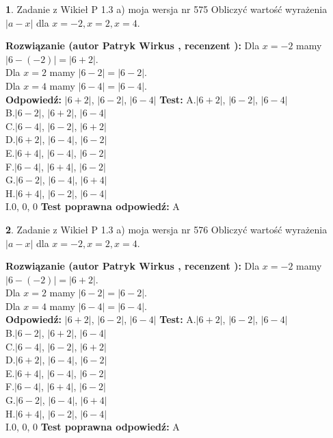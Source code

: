 \documentclass[12pt, a4paper]{article}
\theoremstyle{definition} %
\newtheorem{zad}{}
\newcommand{\zadStart}[1]{\begin{zad}#1\newline}
\newcommand{\zadStop}{\end{zad}}
\newcommand{\rozwStart}[2]{\noindent \textbf{Rozwiązanie (autor #1 , recenzent #2): }\newline}
\newcommand{\rozwStop}{\newline}
\newcommand{\odpStart}{\noindent \textbf{Odpowiedź:}\newline}
\newcommand{\odpStop}{\newline}
\newcommand{\testStart}{\noindent \textbf{Test:}\newline}
\newcommand{\testStop}{\newline}
\newcommand{\kluczStart}{\noindent \textbf{Test poprawna odpowiedź:}\newline}
\newcommand{\kluczStop}{\newline}
\begin{document}
\zadStart{Zadanie z Wikieł P 1.3 a) moja wersja nr 575}
Obliczyć wartość wyrażenia $|a - x|$ dla $x=-2,x=2,x=4$.
\zadStop
\rozwStart{Patryk Wirkus}{}
Dla $x = -2$ mamy $|6 - (-2)| = |6 + 2|$.\\
Dla $x = 2$ mamy $|6 - 2| = |6 - 2|$.\\
Dla $x = 4$ mamy $|6 - 4| = |6 - 4|$.\\
\rozwStop
\odpStart
$|6 + 2|$, $|6 - 2|$, $|6 - 4|$
\odpStop
\testStart
A.$|6 + 2|$, $|6 - 2|$, $|6 - 4|$\\
B.$|6 - 2|$, $|6 + 2|$, $|6 - 4|$\\
C.$|6 - 4|$, $|6 - 2|$, $|6 + 2|$\\
D.$|6 + 2|$, $|6 - 4|$, $|6 - 2|$\\
E.$|6 + 4|$, $|6 - 4|$, $|6 - 2|$\\
F.$|6 - 4|$, $|6 + 4|$, $|6 - 2|$\\
G.$|6 - 2|$, $|6 - 4|$, $|6 + 4|$\\
H.$|6 + 4|$, $|6 - 2|$, $|6 - 4|$\\
I.$0$, $0$, $0$
\testStop
\kluczStart
A
\kluczStop



\zadStart{Zadanie z Wikieł P 1.3 a) moja wersja nr 576}
Obliczyć wartość wyrażenia $|a - x|$ dla $x=-2,x=2,x=4$.
\zadStop
\rozwStart{Patryk Wirkus}{}
Dla $x = -2$ mamy $|6 - (-2)| = |6 + 2|$.\\
Dla $x = 2$ mamy $|6 - 2| = |6 - 2|$.\\
Dla $x = 4$ mamy $|6 - 4| = |6 - 4|$.\\
\rozwStop
\odpStart
$|6 + 2|$, $|6 - 2|$, $|6 - 4|$
\odpStop
\testStart
A.$|6 + 2|$, $|6 - 2|$, $|6 - 4|$\\
B.$|6 - 2|$, $|6 + 2|$, $|6 - 4|$\\
C.$|6 - 4|$, $|6 - 2|$, $|6 + 2|$\\
D.$|6 + 2|$, $|6 - 4|$, $|6 - 2|$\\
E.$|6 + 4|$, $|6 - 4|$, $|6 - 2|$\\
F.$|6 - 4|$, $|6 + 4|$, $|6 - 2|$\\
G.$|6 - 2|$, $|6 - 4|$, $|6 + 4|$\\
H.$|6 + 4|$, $|6 - 2|$, $|6 - 4|$\\
I.$0$, $0$, $0$
\testStop
\kluczStart
A
\kluczStop
\end{document}
